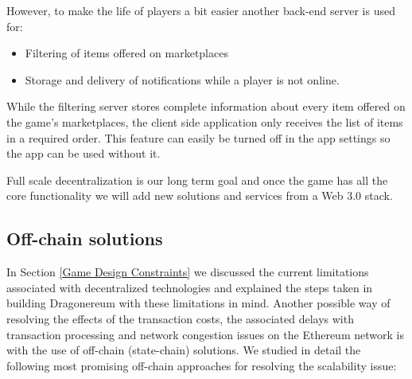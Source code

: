 \documentclass[12pt]{article}
\begin{document}
\begin{samepage}
However, to make the life of players a bit easier another back-end server is used for:\par

\begin{itemize}
	\item Filtering of items offered on marketplaces\par

	\item Storage and delivery of notifications while a player is not online.
\end{itemize}\par
\end{samepage}

While the filtering server stores complete information about every item offered on the game’s marketplaces, the client side application only receives the list of items in a required order. This feature can easily be turned off in the app settings so the app can be used without it.\par

Full scale decentralization is our long term goal and once the game has all the core functionality we will add new solutions and services from a Web 3.0 stack.




\vspace{\baselineskip}\subsection{Off-chain solutions}
 \label{Off-chain solutions} \par

In Section \ref{Game Design Constraints} we discussed the current limitations associated with decentralized technologies and explained the steps taken in building Dragonereum with these limitations in mind. Another possible way of resolving the effects of the transaction costs, the associated delays with transaction processing and network congestion issues on the Ethereum network is with the use of off-chain (state-chain) solutions. We studied in detail the following most promising off-chain approaches for resolving the scalability issue:\par
\end{document}
